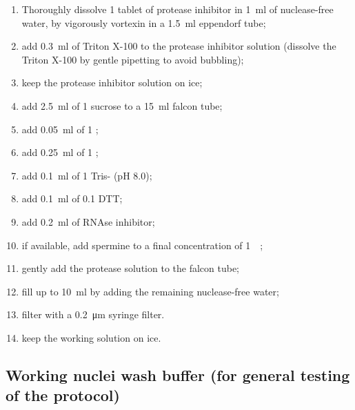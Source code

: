 \documentclass[10pt]{report}
\begin{document}
\begin{enumerate}
	\item Thoroughly dissolve 1 tablet of protease inhibitor in \qty{1}{\ml} of nuclease-free water, by vigorously vortexin in a \qty{1.5}{\ml} eppendorf tube;
	\item add \qty{0.3}{\ml} of Triton X-100 to the protease inhibitor solution (dissolve the Triton X-100 by gentle pipetting to avoid bubbling);
	\item keep the protease inhibitor solution on ice;
	\item add \qty{2.5}{\ml} of \qty{1}{\molar} sucrose to a \qty{15}{\ml} falcon tube;
	\item add \qty{0.05}{\ml} of \qty{1}{\molar} ;
	\item add \qty{0.25}{\ml} of \qty{1}{\molar} ;
	\item add \qty{0.1}{\ml} of \qty{1}{\molar} Tris- (pH \num{8.0});
	\item add \qty{0.1}{\ml} of \qty{0.1}{\molar} DTT;
	\item add \qty{0.2}{\ml} of RNAse inhibitor;
	\item if available, add spermine to a final concentration of \qty{1}{\milli\molar};
	\item gently add the protease solution to the falcon tube;
	\item fill up to \qty{10}{\ml} by adding the remaining nuclease-free water;
	\item filter with a \qty{0.2}{\um} syringe filter.
	\item keep the working solution on ice.	
\end{enumerate}

\subsection*{Working nuclei wash buffer (for general testing of the protocol)}
\end{document}
